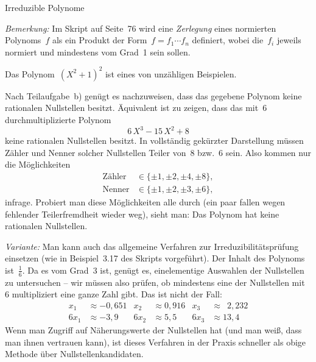 \documentclass{algblatt}
\begin{document}
\begin{aufgabe}{Irreduzible Polynome}
\begin{loesungE}
\emph{Bemerkung:} Im Skript auf Seite~76 wird eine \emph{Zerlegung} eines
normierten Polynoms~$f$ als ein Produkt der Form~$f = f_1 \cdots f_n$
definiert, wobei die~$f_i$ jeweils normiert und mindestens vom Grad~1 sein
sollen.

\item Das Polynom~$(X^2+1)^2$ ist eines von unzähligen Beispielen.

\item Nach Teilaufgabe~b) genügt es nachzuweisen, dass das gegebene Polynom
keine rationalen Nullstellen besitzt. Äquivalent ist zu zeigen, dass das
mit~$6$ durchmultiplizierte Polynom
\[ 6 \, X^3 - 15 \, X^2 + 8 \]
keine rationalen Nullstellen besitzt. In vollständig gekürzter Darstellung
müssen Zähler und Nenner solcher Nullstellen Teiler von~$8$ bzw.~$6$ sein.
Also kommen nur die Möglichkeiten
\begin{align*}
  \text{Zähler} &\in \{ \pm 1, \pm 2, \pm 4, \pm 8 \}, \\
  \text{Nenner} &\in \{ \pm 1, \pm 2, \pm 3, \pm 6 \},
\end{align*}
infrage. Probiert man diese Möglichkeiten alle durch (ein paar fallen
wegen fehlender Teilerfremdheit wieder weg), sieht man: Das Polynom hat keine
rationalen Nullstellen.

\emph{Variante:} Man kann auch das allgemeine Verfahren zur
Irreduzibilitätsprüfung einsetzen (wie in Beispiel~3.17 des Skripts
vorgeführt). Der Inhalt des Polynoms ist~$\frac{1}{6}$. Da es vom Grad~3 ist,
genügt es, einelementige Auswahlen der Nullstellen zu untersuchen -- wir müssen
also prüfen, ob mindestens eine der Nullstellen mit~$6$ multipliziert eine
ganze Zahl gibt. Das ist nicht der Fall:
\begin{align*}
  x_1 &\approx -0{,}651 & x_2 &\approx 0{,}916 & x_3 &\approx \phantom{0}2{,}232 \\
  6 x_1 &\approx -3{,}9 & 6 x_2 &\approx 5{,}5 & 6 x_3 &\approx 13{,}4
\end{align*}
Wenn man Zugriff auf Näherungswerte der Nullstellen hat (und man weiß, dass man
ihnen vertrauen kann), ist dieses Verfahren in der Praxis schneller als obige
Methode über Nullstellenkandidaten.
\end{loesungE}
\end{aufgabe}
\end{document}
